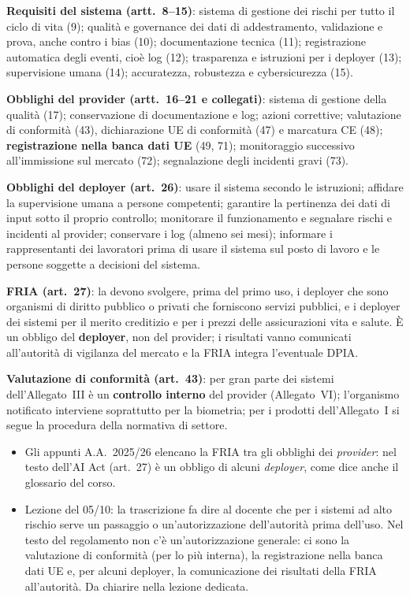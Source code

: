 \begin{integrazione}
\textbf{Requisiti del sistema (artt.~8--15)}: sistema di gestione dei rischi per tutto il ciclo di vita
(9); qualità e governance dei dati di addestramento, validazione e prova, anche contro i bias (10);
documentazione tecnica (11); registrazione automatica degli eventi, cioè log (12); trasparenza e
istruzioni per i deployer (13); supervisione umana (14); accuratezza, robustezza e cybersicurezza (15).

\textbf{Obblighi del provider (artt.~16--21 e collegati)}: sistema di gestione della qualità (17);
conservazione di documentazione e log; azioni correttive; valutazione di conformità (43),
dichiarazione UE di conformità (47) e marcatura CE (48); \textbf{registrazione nella banca dati UE}
(49, 71); monitoraggio successivo all'immissione sul mercato (72); segnalazione degli incidenti gravi
(73).

\textbf{Obblighi del deployer (art.~26)}: usare il sistema secondo le istruzioni; affidare la
supervisione umana a persone competenti; garantire la pertinenza dei dati di input sotto il proprio
controllo; monitorare il funzionamento e segnalare rischi e incidenti al provider; conservare i log
(almeno sei mesi); informare i rappresentanti dei lavoratori prima di usare il sistema sul posto di
lavoro e le persone soggette a decisioni del sistema.

\textbf{FRIA (art.~27)}: la devono svolgere, prima del primo uso, i deployer che sono organismi di
diritto pubblico o privati che forniscono servizi pubblici, e i deployer dei sistemi per il merito
creditizio e per i prezzi delle assicurazioni vita e salute. È un obbligo del \textbf{deployer}, non del
provider; i risultati vanno comunicati all'autorità di vigilanza del mercato e la FRIA integra
l'eventuale DPIA.

\textbf{Valutazione di conformità (art.~43)}: per gran parte dei sistemi dell'Allegato~III è un
\textbf{controllo interno} del provider (Allegato~VI); l'organismo notificato interviene soprattutto per
la biometria; per i prodotti dell'Allegato~I si segue la procedura della normativa di settore.
\end{integrazione}

\begin{verifica}
\begin{itemize}
  \item Gli appunti A.A.~2025/26 elencano la FRIA tra gli obblighi dei \emph{provider}: nel testo
    dell'AI Act (art.~27) è un obbligo di alcuni \emph{deployer}, come dice anche il glossario del
    corso.
  \item Lezione del 05/10: la trascrizione fa dire al docente che per i sistemi ad alto rischio serve un
    passaggio o un'autorizzazione dell'autorità prima dell'uso. Nel testo del regolamento non c'è
    un'autorizzazione generale: ci sono la valutazione di conformità (per lo più interna), la
    registrazione nella banca dati UE e, per alcuni deployer, la comunicazione dei risultati della FRIA
    all'autorità. Da chiarire nella lezione dedicata.
\end{itemize}
\end{verifica}

